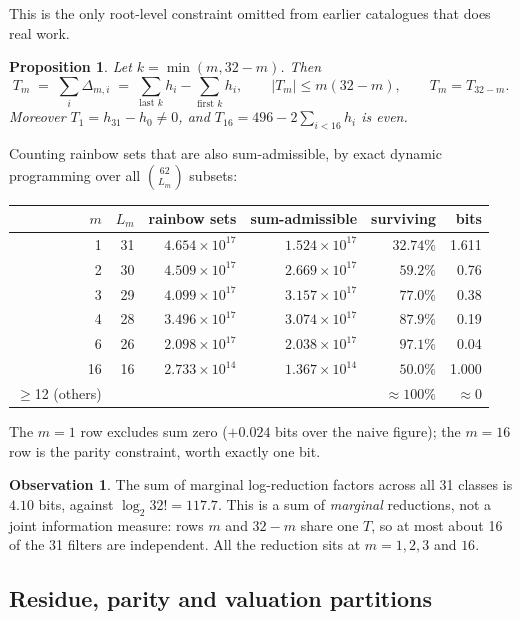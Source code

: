 \documentclass[11pt,a4paper]{article}
\newtheorem{proposition}[theorem]{Proposition}
\theoremstyle{definition}
\newtheorem{observation}[theorem]{Observation}
\begin{document}
This is the only root-level constraint omitted from earlier catalogues that does
real work.

\begin{proposition}
Let $k=\min(m,32-m)$. Then
\[
T_m \;=\; \sum_i \Delta_{m,i}
      \;=\; \sum_{\text{last }k} h_i - \sum_{\text{first }k} h_i,
\qquad |T_m| \le m(32-m),
\qquad T_m = T_{32-m}.
\]
Moreover $T_1 = h_{31}-h_0 \ne 0$, and $T_{16} = 496 - 2\sum_{i<16}h_i$ is
\emph{even}.
\end{proposition}

Counting rainbow sets that are also sum-admissible, by exact dynamic programming
over all $\binom{62}{L_m}$ subsets:

\begin{center}
\begin{tabular}{@{}rrrrrr@{}}
\toprule
$m$ & $L_m$ & rainbow sets & sum-admissible & surviving & bits \\
\midrule
1 & 31 & $4.654\times10^{17}$ & $1.524\times10^{17}$ & $32.74\%$ & 1.611 \\
2 & 30 & $4.509\times10^{17}$ & $2.669\times10^{17}$ & $59.2\%$ & 0.76 \\
3 & 29 & $4.099\times10^{17}$ & $3.157\times10^{17}$ & $77.0\%$ & 0.38 \\
4 & 28 & $3.496\times10^{17}$ & $3.074\times10^{17}$ & $87.9\%$ & 0.19 \\
6 & 26 & $2.098\times10^{17}$ & $2.038\times10^{17}$ & $97.1\%$ & 0.04 \\
16 & 16 & $2.733\times10^{14}$ & $1.367\times10^{14}$ & $50.0\%$ & 1.000 \\
$\ge$12 (others) & & & & $\approx100\%$ & $\approx0$ \\
\bottomrule
\end{tabular}
\end{center}

The $m=1$ row excludes sum zero ($+0.024$ bits over the naive figure); the
$m=16$ row is the parity constraint, worth exactly one bit.

\begin{observation}
The sum of marginal log-reduction factors across all 31 classes is
$\mathbf{4.10}$ bits, against $\log_2 32! = 117.7$. This is a sum of
\emph{marginal} reductions, not a joint information measure: rows $m$ and $32-m$
share one $T$, so at most about 16 of the 31 filters are independent. All the
reduction sits at $m=1,2,3$ and $16$.
\end{observation}

\subsection{Residue, parity and valuation partitions}
\end{document}

